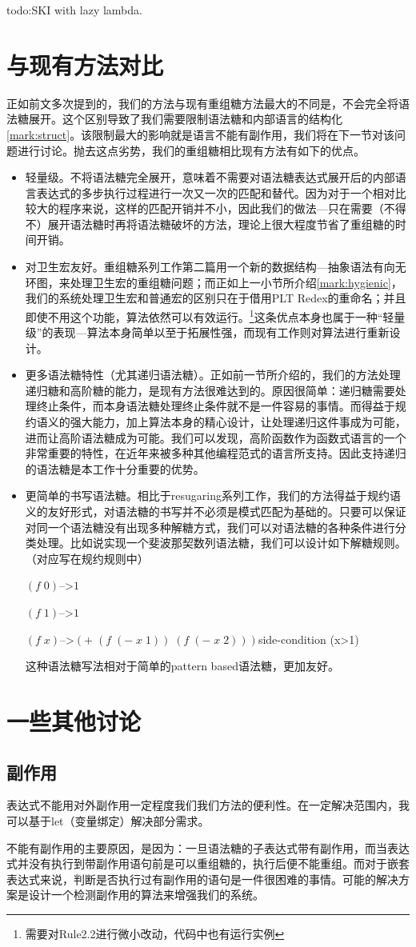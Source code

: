 todo:SKI with lazy lambda.

\section{与现有方法对比}
正如前文多次提到的，我们的方法与现有重组糖方法最大的不同是，不会完全将语法糖展开。这个区别导致了我们需要限制语法糖和内部语言的结构化\ref{mark:struct}。该限制最大的影响就是语言不能有副作用，我们将在下一节对该问题进行讨论。抛去这点劣势，我们的重组糖相比现有方法有如下的优点。
\begin{itemize}
	\item 轻量级。不将语法糖完全展开，意味着不需要对语法糖表达式展开后的内部语言表达式的多步执行过程进行一次又一次的匹配和替代。因为对于一个相对比较大的程序来说，这样的匹配开销并不小，因此我们的做法---只在需要（不得不）展开语法糖时再将语法糖破坏的方法，理论上很大程度节省了重组糖的时间开销。
	\item 对卫生宏友好。重组糖系列工作第二篇用一个新的数据结构---抽象语法有向无环图，来处理卫生宏的重组糖问题；而正如上一小节所介绍\ref{mark:hygienic}，我们的系统处理卫生宏和普通宏的区别只在于借用PLT Redex的重命名；并且即使不用这个功能，算法依然可以有效运行。\footnote{需要对Rule2.2进行微小改动，代码中也有运行实例}这条优点本身也属于一种“轻量级”的表现---算法本身简单以至于拓展性强，而现有工作则对算法进行重新设计。
	\item 更多语法糖特性（尤其递归语法糖）。正如前一节所介绍的，我们的方法处理递归糖和高阶糖的能力，是现有方法很难达到的。原因很简单：递归糖需要处理终止条件，而本身语法糖处理终止条件就不是一件容易的事情。而得益于规约语义的强大能力，加上算法本身的精心设计，让处理递归这件事成为可能，进而让高阶语法糖成为可能。我们可以发现，高阶函数作为函数式语言的一个非常重要的特性，在近年来被多种其他编程范式的语言所支持。因此支持递归的语法糖是本工作十分重要的优势。
	\item 更简单的书写语法糖。相比于resugaring系列工作，我们的方法得益于规约语义的友好形式，对语法糖的书写并不必须是模式匹配为基础的。只要可以保证对同一个语法糖没有出现多种解糖方式，我们可以对语法糖的各种条件进行分类处理。比如说实现一个斐波那契数列语法糖，我们可以设计如下解糖规则。（对应写在规约规则中）
	
	$(f\;0)$-->$1$
	
	$(f\;1)$-->$1$
	
	$(f\;x)$-->$(+\;(f\;(-\;x\;1))\;(f\;(-\;x\;2)))$\qquad side-condition (x>1)
	
	这种语法糖写法相对于简单的pattern based语法糖，更加友好。
\end{itemize}
\section{一些其他讨论}



\subsection{副作用}

表达式不能用对外副作用一定程度我们我们方法的便利性。在一定解决范围内，我可以基于let（变量绑定）解决部分需求。

不能有副作用的主要原因，是因为：一旦语法糖的子表达式带有副作用，而当表达式并没有执行到带副作用语句前是可以重组糖的，执行后便不能重组。而对于嵌套表达式来说，判断是否执行过有副作用的语句是一件很困难的事情。可能的解决方案是设计一个检测副作用的算法来增强我们的系统。
